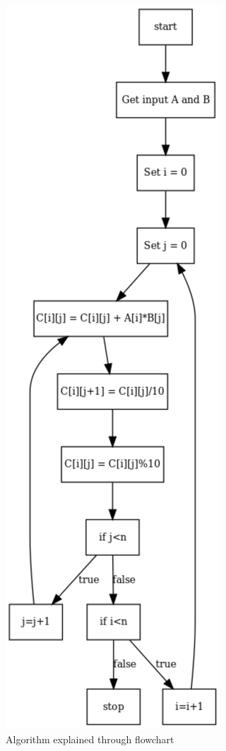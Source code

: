 \documentclass[11pt]{article}
\begin{document}
\begin{figure}[!h]
\centerline{\includegraphics[scale=0.6]{flowc}}
\caption{Algorithm explained through flowchart}
\end{figure}
\end{document}
